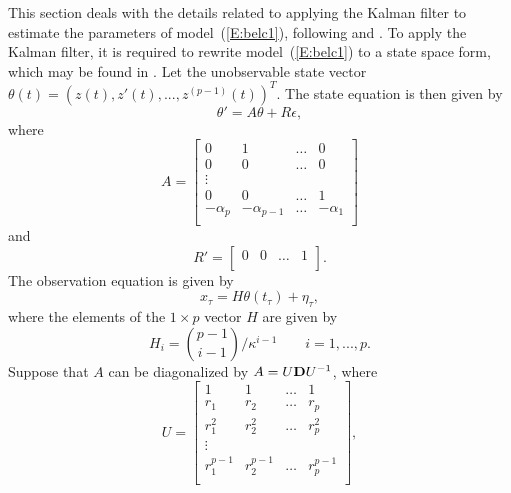 This section deals with the details related to applying the Kalman filter to estimate the parameters of model~(\ref{E:belc1}), following \citet{Jone:1981} and \citet{Belc:Hamp:Tunn:1994}.
 To apply the Kalman filter, it is required to rewrite model~(\ref{E:belc1}) to a state space form, which may be found in \citet{Wibe:1971}. %
Let the unobservable state vector $\theta(t)=(z(t), z'(t), ...,z^{(p-1)}(t))^T$. The state equation is then given by
\begin{equation}\label{E:carsta}
\theta'=A\theta+R\epsilon,
\end{equation}
where
\begin{equation}\label{E:Amat}
A= \begin{bmatrix}
            0 & 1 & \ldots & 0  \\
            0 & 0 & \ldots & 0  \\
            \vdots \\
            0 & 0 & \ldots & 1 \\
            -\alpha_p & -\alpha_{p-1} & \ldots & -\alpha_1\\
          \end{bmatrix}
\end{equation}
and
\begin{equation}\label{E:Rvec}
 R'=         \begin{bmatrix}
            0 & 0 & \hdots & 1\\
          \end{bmatrix}.
\end{equation}
The observation equation is given by
\begin{equation}\label{E:carobs}
x_{\tau}=H\theta(t_{\tau})+\eta_{\tau},
\end{equation}
where the elements of the $1\times p$ vector $H$ are given by
\begin{equation}\label{E:Hvec}
H_i={p-1 \choose i-1} /\kappa^{i-1} \qquad i=1,...,p.
\end{equation}
Suppose that $A$ can be diagonalized by $A=U\bold{D}U^{-1}$, where
\begin{equation}\label{E:Umat}
U= \begin{bmatrix}
            1 & 1 & \ldots & 1  \\
            r_1 & r_2 & \ldots & r_p  \\
            r^2_1 & r^2_2 & \ldots & r^2_p \\
            \vdots \\
            r^{p-1}_1 & r^{p-1}_2 & \ldots & r^{p-1}_p\\
          \end{bmatrix},
\end{equation}
